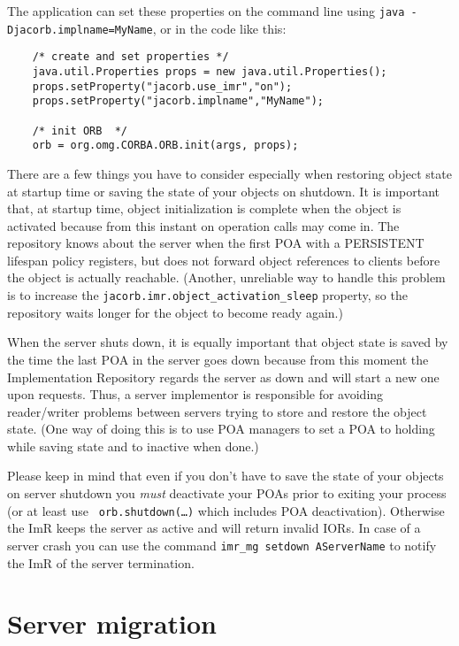 \documentclass[12pt]{scrbook}
\begin{document}
The application  can set  these properties on  the command  line using
{\tt java -Djacorb.implname=MyName}, or in the code like this:

\small{
\begin{verbatim}
    /* create and set properties */
    java.util.Properties props = new java.util.Properties();
    props.setProperty("jacorb.use_imr","on");
    props.setProperty("jacorb.implname","MyName");

    /* init ORB  */
    orb = org.omg.CORBA.ORB.init(args, props);
\end{verbatim}
}

There are a few things  you have to consider especially when restoring
object state  at startup time or  saving the state of  your objects on
shutdown. It is important that, at startup time, object initialization
is complete when the object  is activated because from this instant on
operation calls  may come  in. The repository  knows about  the server
when the  first POA with  a PERSISTENT lifespan policy  registers, but
does not  forward object  references to clients  before the  object is
actually reachable. (Another, unreliable way to handle this problem is
to  increase the {\tt  jacorb.imr.object\_activation\_sleep} property,
so the repository waits longer for the object to become ready again.)

When the server shuts down,  it is equally important that object state
is saved by the time the last POA in the server goes down because from
this moment  the Implementation Repository regards the  server as down
and will start a new one upon requests.  Thus, a server implementor is
responsible for avoiding reader/writer problems between servers trying
to store and  restore the object state.  (One way of  doing this is to
use POA  managers to set  a POA to  holding while saving state  and to
inactive when done.)

Please keep in mind  that even if you don't have to  save the state of
your objects  on server shutdown  you {\em must} deactivate  your POAs
prior   to   exiting   your    process   (or   at   least   use   {\tt
orb.shutdown(\dots)} which  includes POA deactivation).  Otherwise the
ImR keeps the  server as active and will return  invalid IORs. In case
of  a  server crash  you  can use  the  command  {\tt imr\_mg  setdown
AServerName} to notify the ImR of the server termination.

\section{Server migration}
\end{document}
